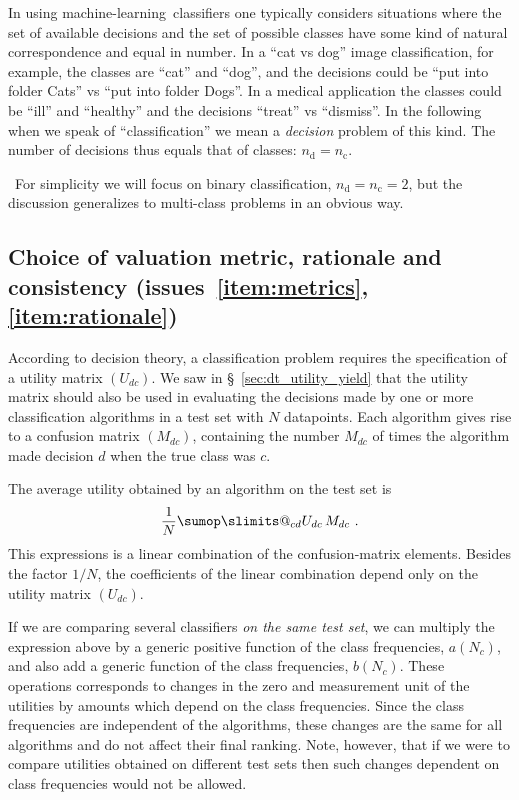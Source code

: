 \documentclass[\ifafour a4paper,12pt,\else a5paper,10pt,\fi%
onecolumn,oneside,article,%
british%
]{memoir}
\makeatletter
\theoremstyle{remark}
\theoremstyle{innote}
\def\sum{\DOTSI\sumop\slimits@}
\renewcommand*{\|}[1][]{\nonscript\:#1\vert\nonscript\:\mathopen{}}
\newcommand*{\sect}{\S}%
\newcommand*{\puzzle}{{\fontencoding{U}\fontfamily{fontawesometwo}\selectfont\symbol{225}}}
\newcommand{\mynoteu}[1]{{\footnotesize\color{notecolour}\puzzle\ #1}}
\newcommand*{\ml}{machine-learning}
\newcommand*{\nd}{n_{\textrm{d}}}
\newcommand*{\nc}{n_{\textrm{c}}}
\makeatother
\begin{document}
In using \ml\ classifiers one typically considers situations where the set of available decisions and the set of possible classes have some kind of natural correspondence and equal in number. In a \enquote{cat vs dog} image classification, for example, the classes are \enquote{cat} and \enquote{dog}, and the decisions could be \enquote{put into folder Cats} vs \enquote{put into folder Dogs}. In a medical application the classes could be \enquote{ill} and \enquote{healthy} and the decisions \enquote{treat} vs \enquote{dismiss}. In the following when we speak of \enquote{classification} we mean a \emph{decision} problem of this kind. The number of decisions thus equals that of classes: $\nd=\nc$.

\mynoteu{For simplicity we will focus on binary classification, $\nd=\nc=2$, but the discussion generalizes to multi-class problems in an obvious way.}


\subsection{Choice of valuation metric, rationale and consistency (issues~\ref{item:metrics}, \ref{item:rationale})}
\label{sec:choice_valuation}

According to decision theory, a classification problem requires the specification of a utility matrix $(U_{dc})$. We saw in \sect~\ref{sec:dt_utility_yield} that the utility matrix should also be used in evaluating the decisions made by one or more classification algorithms in a test set with $N$ datapoints. Each algorithm gives rise to a confusion matrix $(M_{dc})$, containing the number $M_{dc}$ of times the algorithm made decision $d$ when the true class was $c$.

The  average utility obtained by an algorithm on the test set is
\begin{equation}
  \label{eq:utility_testset}
  \frac{1}{N}\sum_{cd} U_{dc}\, M_{dc} \ .
\end{equation}
This expressions is a linear combination of the confusion-matrix elements. Besides the factor $1/N$, the coefficients of the linear combination depend only on the utility matrix $(U_{dc})$.

If we are comparing several classifiers \emph{on the same test set}, we can multiply the expression above by a generic positive function of the class frequencies, $a(N_{c})$, and also add a generic function of the class frequencies, $b(N_{c})$. These operations corresponds to changes in the zero and  measurement unit of the utilities by amounts which depend on the class frequencies. Since the class frequencies are independent of the algorithms, these changes are the same for all algorithms and do not affect their final ranking. Note, however, that if we were to compare utilities obtained on different test sets then such changes dependent on class frequencies would not be allowed.
\end{document}
